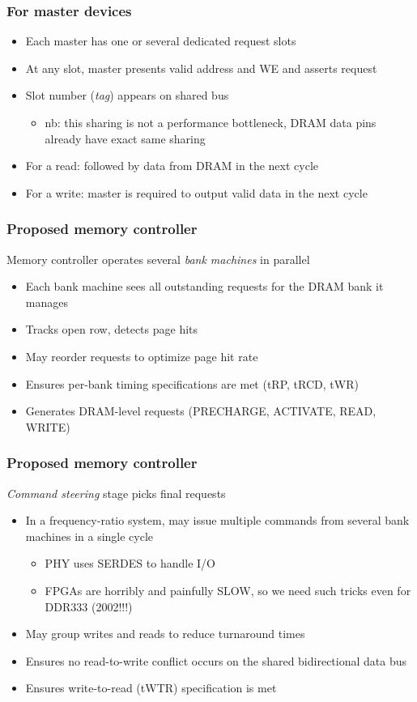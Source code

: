 \documentclass[serif,mathserif]{beamer}
\begin{document}
\begin{frame}
\frametitle{For master devices}
\begin{itemize}
\item Each master has one or several dedicated request slots
\item At any slot, master presents valid address and WE and asserts request
\item Slot number (\textit{tag}) appears on shared bus
\begin{itemize}
\item nb: this sharing is not a performance bottleneck, DRAM data pins already have exact same sharing
\end{itemize}
\item For a read: followed by data from DRAM in the next cycle
\item For a write: master is required to output valid data in the next cycle
\end{itemize}
\end{frame}

\begin{frame}
\frametitle{Proposed memory controller}
Memory controller operates several \textit{bank machines} in parallel
\begin{itemize}
\item Each bank machine sees all outstanding requests for the DRAM bank it manages
\item Tracks open row, detects page hits
\item May reorder requests to optimize page hit rate
\item Ensures per-bank timing specifications are met (tRP, tRCD, tWR)
\item Generates DRAM-level requests (PRECHARGE, ACTIVATE, READ, WRITE)
\end{itemize}
\end{frame}

\begin{frame}
\frametitle{Proposed memory controller}
\textit{Command steering} stage picks final requests
\begin{itemize}
\item In a frequency-ratio system, may issue multiple commands from several bank machines in a single cycle
\begin{itemize}
\item PHY uses SERDES to handle I/O
\item FPGAs are horribly and painfully SLOW, so we need such tricks even for DDR333 (2002!!!)
\end{itemize}
\item May group writes and reads to reduce turnaround times
\item Ensures no read-to-write conflict occurs on the shared bidirectional data bus
\item Ensures write-to-read (tWTR) specification is met
\end{itemize}
\end{frame}
\end{document}
